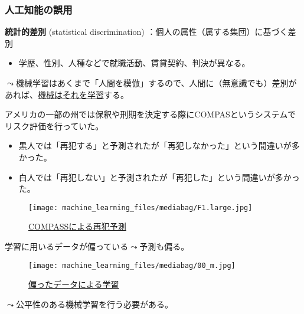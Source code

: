 \documentclass[
  xelatex,
  ja=standard]{bxjsarticle}
\providecommand{\tightlist}{%
  \setlength{\itemsep}{0pt}\setlength{\parskip}{0pt}}\usepackage{longtable,booktabs,array}
\begin{document}
\hypertarget{ux4ebaux5de5ux77e5ux80fdux306eux8aa4ux7528}{%
\subsubsection{人工知能の誤用}\label{ux4ebaux5de5ux77e5ux80fdux306eux8aa4ux7528}}

\textbf{統計的差別} (statistical discrimination)
：個人の属性（属する集団）に基づく差別

\begin{itemize}
\tightlist
\item
  学歴、性別、人種などで就職活動、賃貸契約、判決が異なる。
\end{itemize}

\(\leadsto\)機械学習はあくまで「人間を模倣」するので、人間に（無意識でも）差別があれば、\href{https://ainow.ai/2020/02/17/183256/}{機械はそれを学習}する。

アメリカの一部の州では保釈や刑期を決定する際にCOMPASというシステムでリスク評価を行っていた。

\begin{itemize}
\tightlist
\item
  黒人では「再犯する」と予測されたが「再犯しなかった」という間違いが多かった。
\item
  白人では「再犯しない」と予測されたが「再犯した」という間違いが多かった。
\end{itemize}

\begin{figure}[htpb]

{\centering \texttt{[image: machine\_learning\_files/mediabag/F1.large.jpg]}

}

\caption{\href{https://www.axion.zone/is-the-recidivism-prediction-algorithm-fair-to-race/}{COMPASSによる再犯予測}}

\end{figure}

学習に用いるデータが偏っている\(\leadsto\)予測も偏る。

\begin{figure}[htpb]

{\centering \texttt{[image: machine\_learning\_files/mediabag/00\_m.jpg]}

}

\caption{\href{https://gigazine.net/news/20200702-twitter-ai-machine-learning-racism/}{偏ったデータによる学習}}

\end{figure}

\(\leadsto\)公平性のある機械学習を行う必要がある。
\end{document}
